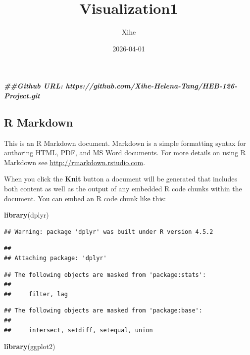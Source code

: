 \documentclass[
]{article}
\title{Visualization1}
\author{Xihe}
\date{2026-04-01}
\newenvironment{Shaded}{\begin{snugshade}}{\end{snugshade}}
\newcommand{\DocumentationTok}[1]{\textcolor[rgb]{0.56,0.35,0.01}{\textbf{\textit{#1}}}}
\newcommand{\FunctionTok}[1]{\textcolor[rgb]{0.13,0.29,0.53}{\textbf{#1}}}
\newcommand{\NormalTok}[1]{#1}
\begin{document}
\maketitle

\begin{Shaded}
\begin{Highlighting}[]
\DocumentationTok{\#\#Github URL: https://github.com/Xihe{-}Helena{-}Tang/HEB{-}126{-}Project.git }
\end{Highlighting}
\end{Shaded}

\subsection{R Markdown}\label{r-markdown}

This is an R Markdown document. Markdown is a simple formatting syntax
for authoring HTML, PDF, and MS Word documents. For more details on
using R Markdown see \url{http://rmarkdown.rstudio.com}.

When you click the \textbf{Knit} button a document will be generated
that includes both content as well as the output of any embedded R code
chunks within the document. You can embed an R code chunk like this:

\begin{Shaded}
\begin{Highlighting}[]
\FunctionTok{library}\NormalTok{(dplyr)}
\end{Highlighting}
\end{Shaded}

\begin{verbatim}
## Warning: package 'dplyr' was built under R version 4.5.2
\end{verbatim}

\begin{verbatim}
## 
## Attaching package: 'dplyr'
\end{verbatim}

\begin{verbatim}
## The following objects are masked from 'package:stats':
## 
##     filter, lag
\end{verbatim}

\begin{verbatim}
## The following objects are masked from 'package:base':
## 
##     intersect, setdiff, setequal, union
\end{verbatim}

\begin{Shaded}
\begin{Highlighting}[]
\FunctionTok{library}\NormalTok{(ggplot2)}
\end{Highlighting}
\end{Shaded}
\end{document}
